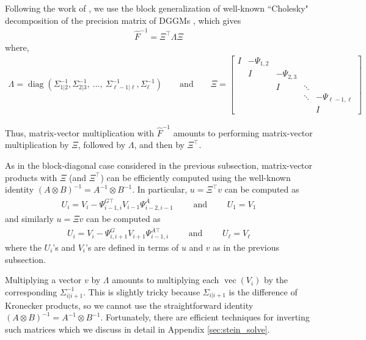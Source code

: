 \documentclass[12pt]{article}
\newcommand{\ovec}{\operatorname{vec}}
\newcommand{\diag}{\operatorname{diag}}
\begin{document}
Following the work of \citet{FANG}, we use the block generalization of well-known ``Cholesky" decomposition of the precision matrix of DGGMs \citep{pourahmadi_old}, which gives
\begin{align*}
\hat{F}^{-1} = \Xi^\top \Lambda \Xi
\end{align*}
where,
\begin{align*}
\Lambda = \diag \left ( \Sigma_{1|2}^{-1}, \Sigma_{2|3}^{-1}, \: \ldots, \: \Sigma_{\ell-1|\ell}^{-1}, \Sigma_\ell^{-1} \right ) \quad \quad  \mbox{and} \quad \quad 
\Xi = 
\begin{bmatrix}
I  & -\Psi_{1,2}  &   &    \\
   &  I & -\Psi_{2,3}  &  \\
 &   &  I &  \ddots \\
 &   &    & \ddots & -\Psi_{\ell-1,\ell} \\
&   &   &     &  I 
\end{bmatrix}
\end{align*}


Thus, matrix-vector multiplication with $\hat{F}^{-1}$ amounts to performing matrix-vector multiplication by $\Xi$, followed by $\Lambda$, and then by $\Xi^\top$.

As in the block-diagonal case considered in the previous subsection, matrix-vector products with $\Xi$ (and $\Xi^\top$) can be efficiently computed using the well-known identity $(A \otimes B)^{-1} = A^{-1} \otimes B^{-1}$.  In particular, $u = \Xi^\top v$ can be computed as
\begin{align*}
U_i = V_i - \Psi^{G\top}_{i-1,i} V_{i-1} \Psi^{\bar{A}}_{i-2,i-1} \quad \quad \mbox{ and } \quad \quad U_1 = V_1
\end{align*}
and similarly $u = \Xi v$ can be computed as
\begin{align*}
U_i = V_i - \Psi^G_{i,i+1} V_{i+1} \Psi^{\bar{A}\top}_{i-1,i} \quad \quad \mbox{ and } \quad \quad U_\ell = V_\ell
\end{align*}
where the $U_i$'s and $V_i$'s are defined in terms of $u$ and $v$ as in the previous subsection.

Multiplying a vector $v$ by $\Lambda$ amounts to multiplying each $\ovec(V_i)$ by the corresponding $\Sigma_{i|i+1}^{-1}$.  This is slightly tricky because $\Sigma_{i|i+1}$ is the difference of Kronecker products, so we cannot use the straightforward identity $(A \otimes B)^{-1} = A^{-1} \otimes B^{-1}$.  Fortunately, there are efficient techniques for inverting such matrices which we discuss in detail in Appendix \ref{sec:stein_solve}.
\end{document}
